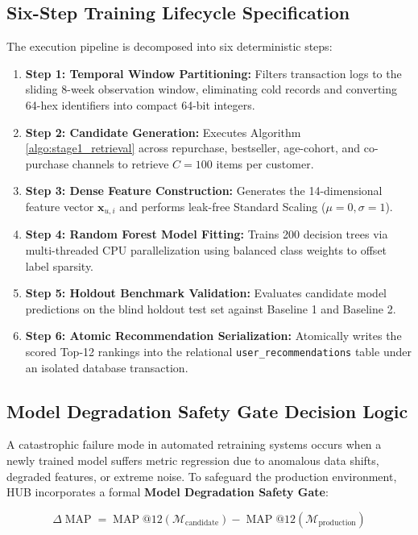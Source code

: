 \subsection{Six-Step Training Lifecycle Specification}
The execution pipeline is decomposed into six deterministic steps:
\begin{enumerate}
    \item \textbf{Step 1: Temporal Window Partitioning:} Filters transaction logs to the sliding 8-week observation window, eliminating cold records and converting 64-hex identifiers into compact 64-bit integers.
    \item \textbf{Step 2: Candidate Generation:} Executes Algorithm \ref{algo:stage1_retrieval} across repurchase, bestseller, age-cohort, and co-purchase channels to retrieve $C=100$ items per customer.
    \item \textbf{Step 3: Dense Feature Construction:} Generates the 14-dimensional feature vector $\mathbf{x}_{u,i}$ and performs leak-free Standard Scaling ($\mu=0, \sigma=1$).
    \item \textbf{Step 4: Random Forest Model Fitting:} Trains 200 decision trees via multi-threaded CPU parallelization using balanced class weights to offset label sparsity.
    \item \textbf{Step 5: Holdout Benchmark Validation:} Evaluates candidate model predictions on the blind holdout test set against Baseline 1 and Baseline 2.
    \item \textbf{Step 6: Atomic Recommendation Serialization:} Atomically writes the scored Top-12 rankings into the relational \texttt{user\_recommendations} table under an isolated database transaction.
\end{enumerate}

\subsection{Model Degradation Safety Gate Decision Logic}
A catastrophic failure mode in automated retraining systems occurs when a newly trained model suffers metric regression due to anomalous data shifts, degraded features, or extreme noise. To safeguard the production environment, HUB incorporates a formal \textbf{Model Degradation Safety Gate}:

\begin{equation}
    \Delta \operatorname{MAP} = \operatorname{MAP}@12(\mathcal{M}_{\text{candidate}}) - \operatorname{MAP}@12(\mathcal{M}_{\text{production}})
\end{equation}

